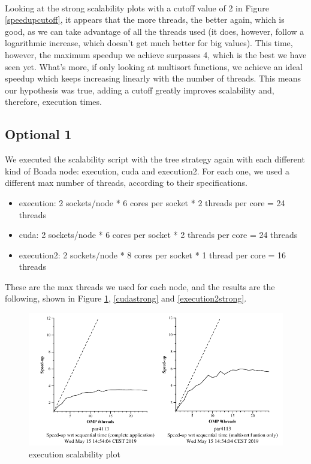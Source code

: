 \documentclass[12]{article}
\begin{document}
\\
Looking at the strong scalability plots with a cutoff value of 2 in Figure \ref{speedupcutoff}, it appears that the more threads, the better again, which is good, as we can take advantage of all the threads used (it does, however, follow a logarithmic increase, which doesn't get much better for big values). This time, however, the maximum speedup we achieve surpasses 4, which is the best we have seen yet. What's more, if only looking at multisort functions, we achieve an ideal speedup which keeps increasing linearly with the number of threads. This means our hypothesis was true, adding a cutoff greatly improves scalability and, therefore, execution times.

\subsection{Optional 1}
We executed the scalability script with the tree strategy again with each different kind of Boada node: execution, cuda and execution2. For each one, we used a different max number of threads, according to their specifications.
\begin{itemize}
    \item execution: 2 sockets/node * 6 cores per socket * 2 threads per core = 24 threads
    \item cuda: 2 sockets/node * 6 cores per socket * 2 threads per core = 24 threads
    \item execution2: 2 sockets/node * 8 cores per socket * 1 thread per core = 16 threads
\end{itemize}
These are the max threads we used for each node, and the results are the following, shown in Figure \ref{executionstrong}, \ref{cudastrong} and \ref{execution2strong}.
\\
\medskip
\begin{figure}[H]
    \centering
    \includegraphics[scale=0.75]{images/executionStrong.png}
    \caption{execution scalability plot}
    \label{executionstrong}
\end{figure}
\end{document}
